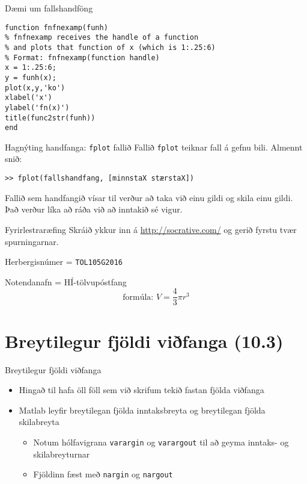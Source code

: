 \documentclass{beamer}
\begin{document}
\begin{frame}[fragile]{Dæmi um fallshandföng}
\begin{verbatim}
function fnfnexamp(funh)
% fnfnexamp receives the handle of a function
% and plots that function of x (which is 1:.25:6)
% Format: fnfnexamp(function handle)
x = 1:.25:6;
y = funh(x);
plot(x,y,'ko')
xlabel('x')
ylabel('fn(x)')
title(func2str(funh))
end
\end{verbatim}

\end{frame}

\begin{frame}[fragile]{Hagnýting handfanga: \texttt{fplot} fallið}
Fallið \texttt{fplot} teiknar fall á gefnu bili. Almennt snið:
\begin{verbatim}
>> fplot(fallshandfang, [minnstaX stærstaX])
\end{verbatim}
Fallið sem handfangið vísar til verður að taka við einu gildi og skila einu gildi. Það verður líka að ráða við að inntakið sé vigur.
\end{frame}

\begin{frame}{Fyrirlestraræfing}
Skráið ykkur inn á \url{http://socrative.com/} og gerið fyrstu tvær spurningarnar.

Herbergisnúmer = \texttt{TOL105G2016}

Notendanafn = HÍ-tölvupóstfang
\[
 \text{formúla: } V = \frac{4}{3} \pi r^3
\]
\end{frame}

\section{Breytilegur fjöldi viðfanga (10.3)}

\begin{frame}{Breytilegur fjöldi viðfanga}
\begin{itemize}
 \item Hingað til hafa öll föll sem við skrifum tekið fastan fjölda viðfanga
 \item Matlab leyfir breytilegan fjölda inntaksbreyta og breytilegan fjölda skilabreyta
 \begin{itemize}
  \item Notum hólfavigrana \texttt{varargin} og \texttt{varargout} til að geyma inntaks- og skilabreyturnar
  \item Fjöldinn fæst með \texttt{nargin} og \texttt{nargout}
 \end{itemize}
\end{itemize}
\end{frame}
\end{document}
